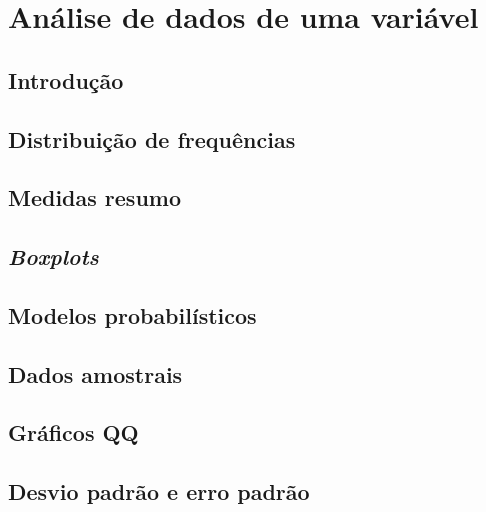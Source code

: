 \documentclass[
]{latex/krantz}
\theoremstyle{definition}
\theoremstyle{definition}
\theoremstyle{definition}
\theoremstyle{definition}
\theoremstyle{remark}
\begin{document}
\hypertarget{anuxe1lise-de-dados-de-uma-variuxe1vel}{%
\chapter{Análise de dados de uma variável}\label{anuxe1lise-de-dados-de-uma-variuxe1vel}}

\hypertarget{introduuxe7uxe3o-1}{%
\section{Introdução}\label{introduuxe7uxe3o-1}}

\hypertarget{distribuiuxe7uxe3o-de-frequuxeancias}{%
\section{Distribuição de frequências}\label{distribuiuxe7uxe3o-de-frequuxeancias}}

\hypertarget{medidas-resumo}{%
\section{Medidas resumo}\label{medidas-resumo}}

\hypertarget{boxplots}{%
\section{\texorpdfstring{\emph{Boxplots}}{Boxplots}}\label{boxplots}}

\hypertarget{modelos-probabiluxedsticos}{%
\section{Modelos probabilísticos}\label{modelos-probabiluxedsticos}}

\hypertarget{dados-amostrais}{%
\section{Dados amostrais}\label{dados-amostrais}}

\hypertarget{gruxe1ficos-qq}{%
\section{Gráficos QQ}\label{gruxe1ficos-qq}}

\hypertarget{desvio-padruxe3o-e-erro-padruxe3o}{%
\section{Desvio padrão e erro padrão}\label{desvio-padruxe3o-e-erro-padruxe3o}}
\end{document}
